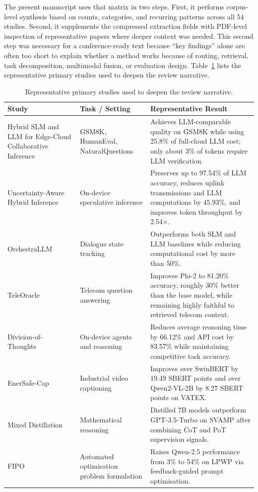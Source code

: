 The present manuscript uses that matrix in two steps. First, it performs corpus-level synthesis based on counts, categories, and recurring patterns across all 54 studies. Second, it supplements the compressed extraction fields with PDF-level inspection of representative papers where deeper context was needed. This second step was necessary for a conference-ready text because ``key findings'' alone are often too short to explain whether a method works because of routing, retrieval, task decomposition, multimodal fusion, or evaluation design. Table~\ref{tab:representative-studies} lists the representative primary studies used to deepen the review narrative.

\begin{table}[t]
\caption{Representative primary studies used to deepen the review narrative.}
\label{tab:representative-studies}
\centering
\scriptsize
\begin{tabularx}{\textwidth}{@{}>{\raggedright\arraybackslash}p{2.9cm}>{\raggedright\arraybackslash}p{2.5cm}X@{}}
\toprule
\textbf{Study} & \textbf{Task / Setting} & \textbf{Representative Result} \\
\midrule
Hybrid SLM and LLM for Edge-Cloud Collaborative Inference~\cite{hao2024hybrid} & GSM8K, HumanEval, NaturalQuestions & Achieves LLM-comparable quality on GSM8K while using 25.8\% of full-cloud LLM cost; only about 3\% of tokens require LLM verification. \\
Uncertainty-Aware Hybrid Inference~\cite{oh2025uncertainty} & On-device speculative inference & Preserves up to 97.54\% of LLM accuracy, reduces uplink transmissions and LLM computations by 45.93\%, and improves token throughput by 2.54$\times$. \\
OrchestraLLM~\cite{lee2024orchestrallm} & Dialogue state tracking & Outperforms both SLM and LLM baselines while reducing computational cost by more than 50\%. \\
TeleOracle~\cite{alabbasi2024teleoracle} & Telecom question answering & Improves Phi-2 to 81.20\% accuracy, roughly 30\% better than the base model, while remaining highly faithful to retrieved telecom context. \\
Division-of-Thoughts~\cite{shao2025dot} & On-device agents and reasoning & Reduces average reasoning time by 66.12\% and API cost by 83.57\% while maintaining competitive task accuracy. \\
EnerSafe-Cap~\cite{cao2025enersafe} & Industrial video captioning & Improves over SwinBERT by 19.49 SBERT points and over Qwen2-VL-2B by 8.27 SBERT points on VATEX. \\
Mixed Distillation~\cite{li2024mixed} & Mathematical reasoning & Distilled 7B models outperform GPT-3.5-Turbo on SVAMP after combining CoT and PoT supervision signals. \\
FIPO~\cite{amarasinghe2025fipo} & Automated optimisation problem formulation & Raises Qwen-2.5 performance from 3\% to 54\% on LPWP via feedback-guided prompt optimisation. \\
\bottomrule
\end{tabularx}
\end{table}
